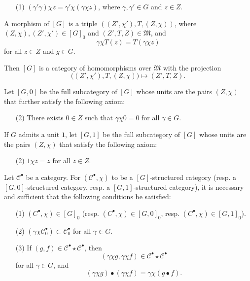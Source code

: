 \documentclass[a4paper,fleqn]{article}
\theoremstyle{plain}
\newenvironment{proposition}[1]
  {\renewcommand\theinnerproposition{#1}\innerproposition}
  {\endinnerproposition}
\theoremstyle{definition}
\newcommand{\CC}{\mathcal{C}}
\newcommand{\MM}{\mathfrak{M}}
\begin{document}
\begin{enumerate}
  \item[\normalfont(1)]
    $(\gamma'\gamma)\chi z=\gamma'\chi(\gamma\chi z)$, where $\gamma,\gamma'\in G$ and $z\in Z$.
\end{enumerate}

A morphism of $[G]$ is a triple $((Z',\chi'),T,(Z,\chi))$, where $(Z,\chi),(Z',\chi')\in[G]_0$ and $(Z',T,Z)\in\MM$, and
\[
  \gamma\chi T(z)
  = T(\gamma\chi z)
\]
for all $z\in Z$ and $g\in G$.

Then $[G]$ is a category of homomorphisms over $\MM$ with the projection
\[
  \big(
    (Z',\chi'), T, (Z,\chi)
  \big)
  \longmapsto (Z',T,Z).
\]

Let $[G,0]$ be the full subcategory of $[G]$ whose units are the pairs $(Z,\chi)$ that further satisfy the following axiom:

\begin{enumerate}
  \item[\normalfont(2)]
    There exists $0\in Z$ such that $\gamma\chi0=0$ for all $\gamma\in G$.
\end{enumerate}

If $G$ admits a unit $1$, let $[G,1]$ be the full subcategory of $[G]$ whose units are the pairs $(Z,\chi)$ that satisfy the following axiom:

\begin{enumerate}
  \item[\normalfont(2\textquotesingle)]
    $1\chi z=z$ for all $z\in Z$.
\end{enumerate}

\begin{proposition}{3}
\label{proposition:ii-3}
  Let $\CC^\bullet$ be a category.
  For $(\CC^\bullet,\chi)$ to be a $[G]$-structured category (resp. a $[G,0]$-structured category, resp. a $[G,1]$-structured category), it is necessary and sufficient that the following conditions be satisfied:

  \begin{enumerate}
    \item[\normalfont(1)]
      $(C^\bullet,\chi)\in[G]_0$ (resp. $(C^\bullet,\chi)\in[G,0]_0$, resp. $(C^\bullet,\chi)\in[G,1]_0$).
    \item[\normalfont(2)]
      $(\gamma\chi\CC_0^\bullet)\subset\CC_0^\bullet$ for all $\gamma\in G$.
    \item[\normalfont(3)]
      If $(g,f)\in\CC^\bullet\star\CC^\bullet$, then
      \[
        (\gamma\chi g,\gamma\chi f)
        \in\CC^\bullet\star\CC^\bullet
      \]
      for all $\gamma\in G$, and
      \[
        (\gamma\chi g)\bullet(\gamma\chi f)
        = \gamma\chi(g\bullet f).
      \]
  \end{enumerate}
\end{proposition}
\end{document}
